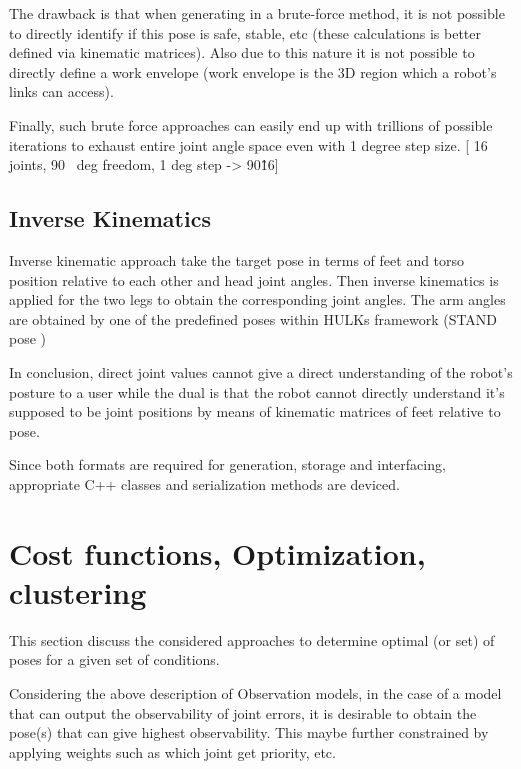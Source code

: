 \documentclass[english, printversion, nomenclature, notitle]{tuvisionthesis} %
\begin{document}
The drawback is that when generating in a brute-force method, it is not possible to directly identify if this pose is safe, stable, etc (these calculations is better defined via kinematic matrices). Also due to this nature it is not possible to directly define a work envelope (work envelope is the 3D region which a robot's links can access).

Finally, such brute force approaches can easily end up with trillions  of possible iterations to exhaust entire joint angle space even with 1 degree step size. [ 16~ joints, 90~ deg freedom, 1 deg step -> 90\^16] 

\subsection{Inverse Kinematics}

Inverse kinematic approach take the target pose in terms of feet and torso position relative to each other and head joint angles. Then inverse kinematics is applied for the two legs to obtain the corresponding joint angles. The arm angles are obtained by one of the predefined poses within HULKs framework (STAND pose )

In conclusion, direct joint values cannot give a direct understanding of the robot's posture to a user while the dual is that the robot cannot directly understand it's supposed to be joint positions by means of kinematic matrices of feet relative to pose. 

Since both formats are required for generation, storage and interfacing, appropriate C++ classes and serialization methods are deviced.


\section{Cost functions, Optimization, clustering}

This section discuss the considered approaches to determine optimal (or set) of poses for a given set of conditions.

Considering the above description of Observation models, in the case of a model that can output the observability of joint errors, it is desirable to obtain the pose(s) that can give highest observability. This maybe further constrained by applying weights such as which joint get priority, etc.
\end{document}
